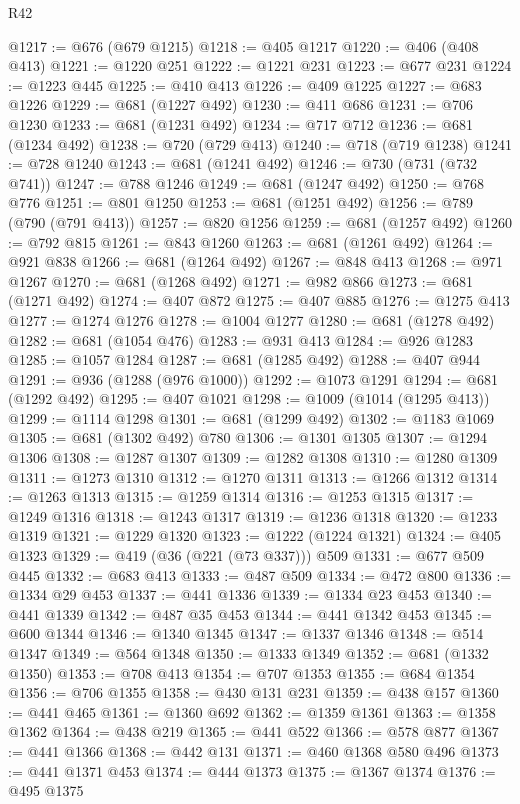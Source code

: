 \begin{lexlean}{R42}
\begin{coremodule}
@1217 := @676 (@679 @1215)
@1218 := @405 @1217
@1220 := @406 (@408 @413)
@1221 := @1220 @251
@1222 := @1221 @231
@1223 := @677 @231
@1224 := @1223 @445
@1225 := @410 @413
@1226 := @409 @1225
@1227 := @683 @1226
@1229 := @681 (@1227 @492)
@1230 := @411 @686
@1231 := @706 @1230
@1233 := @681 (@1231 @492)
@1234 := @717 @712
@1236 := @681 (@1234 @492)
@1238 := @720 (@729 @413)
@1240 := @718 (@719 @1238)
@1241 := @728 @1240
@1243 := @681 (@1241 @492)
@1246 := @730 (@731 (@732 @741))
@1247 := @788 @1246
@1249 := @681 (@1247 @492)
@1250 := @768 @776
@1251 := @801 @1250
@1253 := @681 (@1251 @492)
@1256 := @789 (@790 (@791 @413))
@1257 := @820 @1256
@1259 := @681 (@1257 @492)
@1260 := @792 @815
@1261 := @843 @1260
@1263 := @681 (@1261 @492)
@1264 := @921 @838
@1266 := @681 (@1264 @492)
@1267 := @848 @413
@1268 := @971 @1267
@1270 := @681 (@1268 @492)
@1271 := @982 @866
@1273 := @681 (@1271 @492)
@1274 := @407 @872
@1275 := @407 @885
@1276 := @1275 @413
@1277 := @1274 @1276
@1278 := @1004 @1277
@1280 := @681 (@1278 @492)
@1282 := @681 (@1054 @476)
@1283 := @931 @413
@1284 := @926 @1283
@1285 := @1057 @1284
@1287 := @681 (@1285 @492)
@1288 := @407 @944
@1291 := @936 (@1288 (@976 @1000))
@1292 := @1073 @1291
@1294 := @681 (@1292 @492)
@1295 := @407 @1021
@1298 := @1009 (@1014 (@1295 @413))
@1299 := @1114 @1298
@1301 := @681 (@1299 @492)
@1302 := @1183 @1069
@1305 := @681 (@1302 @492) @780
@1306 := @1301 @1305
@1307 := @1294 @1306
@1308 := @1287 @1307
@1309 := @1282 @1308
@1310 := @1280 @1309
@1311 := @1273 @1310
@1312 := @1270 @1311
@1313 := @1266 @1312
@1314 := @1263 @1313
@1315 := @1259 @1314
@1316 := @1253 @1315
@1317 := @1249 @1316
@1318 := @1243 @1317
@1319 := @1236 @1318
@1320 := @1233 @1319
@1321 := @1229 @1320
@1323 := @1222 (@1224 @1321)
@1324 := @405 @1323
@1329 := @419 (@36 (@221 (@73 @337))) @509
@1331 := @677 @509 @445
@1332 := @683 @413
@1333 := @487 @509
@1334 := @472 @800
@1336 := @1334 @29 @453
@1337 := @441 @1336
@1339 := @1334 @23 @453
@1340 := @441 @1339
@1342 := @487 @35 @453
@1344 := @441 @1342 @453
@1345 := @600 @1344
@1346 := @1340 @1345
@1347 := @1337 @1346
@1348 := @514 @1347
@1349 := @564 @1348
@1350 := @1333 @1349
@1352 := @681 (@1332 @1350)
@1353 := @708 @413
@1354 := @707 @1353
@1355 := @684 @1354
@1356 := @706 @1355
@1358 := @430 @131 @231
@1359 := @438 @157
@1360 := @441 @465
@1361 := @1360 @692
@1362 := @1359 @1361
@1363 := @1358 @1362
@1364 := @438 @219
@1365 := @441 @522
@1366 := @578 @877
@1367 := @441 @1366
@1368 := @442 @131
@1371 := @460 @1368 @580 @496
@1373 := @441 @1371 @453
@1374 := @444 @1373
@1375 := @1367 @1374
@1376 := @495 @1375

\end{coremodule}
\end{lexlean}
